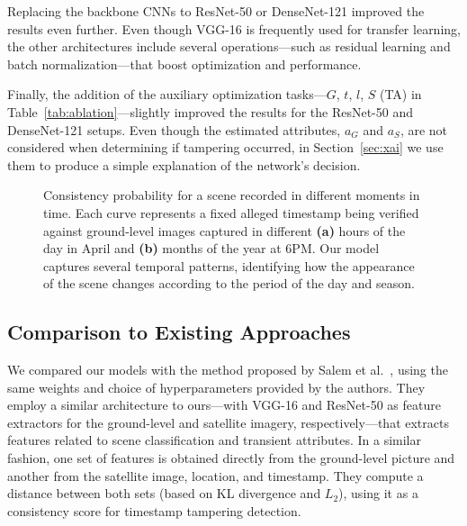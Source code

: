 \documentclass[journal]{IEEEtran}
\begin{document}
        Replacing the backbone CNNs to ResNet-50 or DenseNet-121 improved the results even further. Even though VGG-16 is frequently used for transfer learning, the other architectures include several operations---such as residual learning and batch normalization---that boost optimization and performance.
        
        Finally, the addition of the auxiliary optimization tasks---$G$, $t$, $l$, $S$ (TA) in Table~\ref{tab:ablation}---slightly improved the results for the ResNet-50 and DenseNet-121 setups. Even though the estimated attributes, $a_G$ and $a_S$, are not considered when determining if tampering occurred, in Section~\ref{sec:xai} we use them to produce a simple explanation of the network's decision.
        
       \begin{figure*}[!t]
            \centering
            \hfill
            
            \caption{Consistency probability for a scene recorded in different moments in time. Each curve represents a fixed alleged timestamp being verified against ground-level images captured in different \textbf{(a)} hours of the day in April and \textbf{(b)} months of the year at 6\textsc{PM}. Our model captures several temporal patterns, identifying how the appearance of the scene changes according to the period of the day and season.}
            \label{fig:consistency_variation}
        \end{figure*}
        
    \subsection{Comparison to Existing Approaches}\label{sec:exp_comparison_sota}        
        We compared our models with the method proposed by Salem et al.~\cite{salem2020learning}, using the same weights and choice of hyperparameters provided by the authors. They employ a similar architecture to ours---with VGG-16 and ResNet-50 as feature extractors for the ground-level and satellite imagery, respectively---that extracts features related to scene classification and transient attributes. In a similar fashion, one set of features is obtained directly from the ground-level picture and another from the satellite image, location, and timestamp. They compute a distance between both sets (based on KL divergence and $L_2$), using it as a consistency score for timestamp tampering detection. 
        
\end{document}
